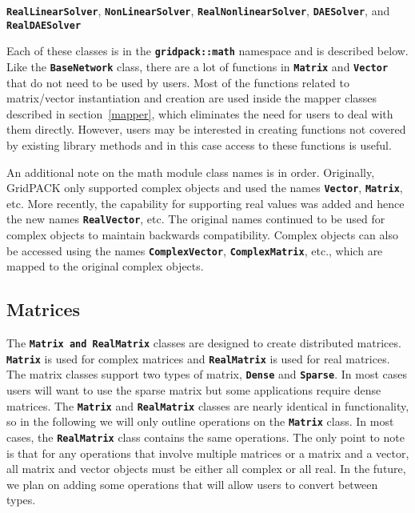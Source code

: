 \texttt{\textbf{RealLinearSolver}}, \texttt{\textbf{NonLinearSolver}},
\texttt{\textbf{RealNonlinearSolver}}, \texttt{\textbf{DAESolver}},
and \texttt{\textbf{RealDAESolver}}

Each of these classes is in the \texttt{\textbf{gridpack::math}} namespace and
is described below. Like the \texttt{\textbf{BaseNetwork}} class, there are a
lot of functions in \texttt{\textbf{Matrix}} and \texttt{\textbf{Vector}} that
do not need to be used by users. Most of the functions related to matrix/vector
instantiation and creation are used inside the mapper classes described in
section~\ref{mapper}, which eliminates the need for users to deal with them directly. However, users may be interested in creating functions not covered by existing library methods and in this case access to these functions is useful.

An additional note on the math module class names is in order. Originally, GridPACK only supported complex objects and used the names \texttt{\textbf{Vector}}, \texttt{\textbf{Matrix}}, etc. More recently, the capability for supporting real values was added and hence the new names \texttt{\textbf{RealVector}}, etc. The original names continued to be used for complex objects to maintain backwards compatibility. Complex objects can also be accessed using the names \texttt{\textbf{ComplexVector}}, \texttt{\textbf{ComplexMatrix}}, etc., which are mapped to the original complex objects.

\subsection{Matrices}

The \texttt{\textbf{Matrix and RealMatrix}} classes are designed to create distributed matrices. \texttt{\textbf{Matrix}} is used for complex matrices and \texttt{\textbf{RealMatrix}} is used for real matrices. The matrix classes support two types of matrix, \texttt{\textbf{Dense}} and \texttt{\textbf{Sparse}}. In most cases users will want to use the sparse matrix but some applications require dense matrices. The \texttt{\textbf{Matrix}} and \texttt{\textbf{RealMatrix}} classes are nearly identical in functionality, so in the following we will only outline operations on the \texttt{\textbf{Matrix}} class. In most cases, the \texttt{\textbf{RealMatrix}} class contains the same operations. The only point to note is that for any operations that involve multiple matrices or a matrix and a vector, all matrix and vector objects must be either all complex or all real. In the future, we plan on adding some operations that will allow users to convert between types.

